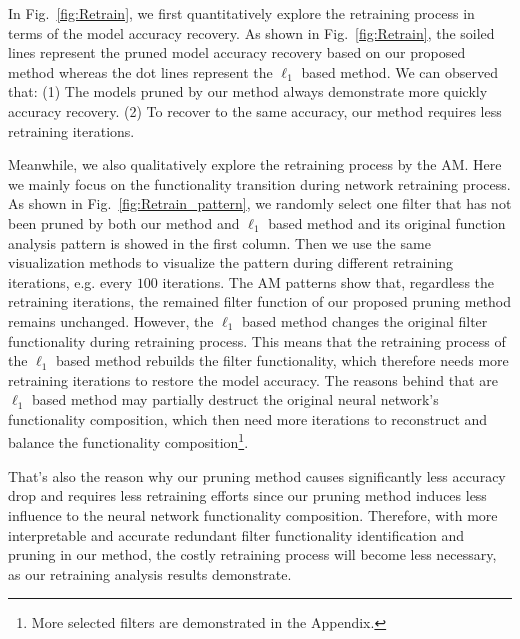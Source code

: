 \documentclass{article} %
\begin{document}
In Fig.~\ref{fig:Retrain}, we first quantitatively explore the retraining process in terms of the model accuracy recovery.
  As shown in Fig.~\ref{fig:Retrain}, the soiled lines represent the pruned model accuracy recovery based on our proposed method whereas the dot lines represent the $\ell_1$ based method.
  We can observed that:
  (1) The models pruned by our method always demonstrate more quickly accuracy recovery.
  (2) To recover to the same accuracy, our method requires less retraining iterations.

Meanwhile, we also qualitatively explore the retraining process by the AM. Here we mainly focus on the functionality transition during network retraining process.
  As shown in Fig.~\ref{fig:Retrain_pattern}, we randomly select one filter that has not been pruned by both our method and $\ell_1$ based method and its original function analysis pattern is showed in the first column.
  Then we use the same visualization methods to visualize the pattern during different retraining iterations, e.g. every $100$ iterations. 
  The AM patterns show that, regardless the retraining iterations, the remained filter function of our proposed pruning method remains unchanged. 
  However, the $\ell_1$ based method changes the original filter functionality during retraining process. This means that the retraining process of the $\ell_1$ based method rebuilds the filter functionality, which therefore needs more retraining iterations to restore the model accuracy. The reasons behind that are $\ell_1$ based method may partially destruct the original neural network's functionality composition, which then need more iterations to reconstruct and balance the functionality composition\footnote{More selected filters are demonstrated in the Appendix.}.
  
  That's also the reason why our pruning method causes significantly less accuracy drop and requires less retraining efforts since our pruning method induces less influence to the neural network functionality composition.
  Therefore, with more interpretable and accurate redundant filter functionality identification and pruning in our method, the costly retraining process will become less necessary, as our retraining analysis results demonstrate.
\end{document}
